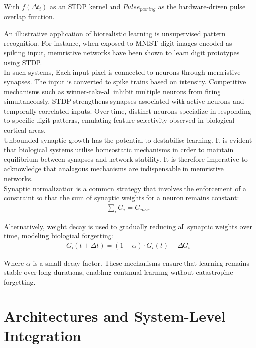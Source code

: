 \noindent With $f(\Delta t_i)$ as an STDP kernel and $Pulse_{pairing}$ as the hardware-driven pulse overlap function.

\noindent An illustrative application of biorealistic learning is unsupervised pattern recognition. For instance, when exposed to MNIST digit images encoded as spiking input, memristive networks have been shown to learn digit prototypes using STDP.\\

\noindent In such systems, Each input pixel is connected to neurons through memristive synapses. The input is converted to spike trains based on intensity. Competitive mechanisms such as winner-take-all inhibit multiple neurons from firing simultaneously. STDP strengthens synapses associated with active neurons and temporally correlated inputs. Over time, distinct neurons specialize in responding to specific digit patterns, emulating feature selectivity observed in biological cortical areas.\\

\noindent Unbounded synaptic growth has the potential to destabilise learning. It is evident that biological systems utilise homeostatic mechanisms in order to maintain equilibrium between synapses and network stability. It is therefore imperative to acknowledge that analogous mechanisms are indispensable in memristive networks. \\

\noindent Synaptic normalization is a common strategy that involves the enforcement of a constraint so that the sum of synaptic weights for a neuron remains constant:
\begin{align}
    \sum_{i} G_i = G_{max} \label{eq:2.38}
\end{align}

\noindent Alternatively, weight decay is used to gradually reducing all synaptic weights over time, modeling biological forgetting:
\begin{align}
    G_i(t + \Delta t) = (1 - \alpha) \cdot G_i(t) + \Delta G_i \label{eq:2.39}
\end{align}

\noindent Where $\alpha$ is a small decay factor. These mechanisms ensure that learning remains stable over long durations, enabling continual learning without catastrophic forgetting.

\section[Architectures and System-Level Integration]{Architectures and System-Level Integration}

